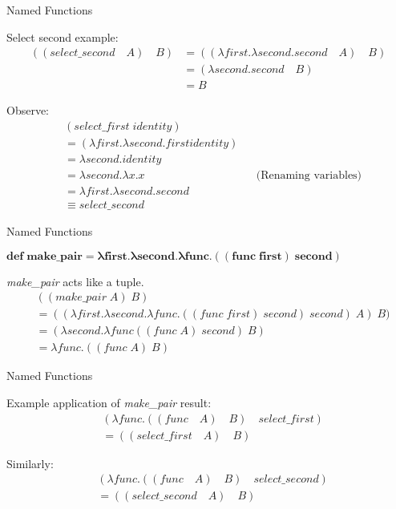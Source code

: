 \documentclass{beamer}
\begin{document}
\begin{frame}{Named Functions}
\begin{block}{Select second example:}
	\[\begin{aligned}
    	((select\_second \quad A) \quad B) &= ((\lambda first . \lambda second . second \quad A) \quad B) \\
        &= (\lambda second. second \quad B) \\
        &= B
    \end{aligned}\]
\end{block}
\begin{block}{Observe:}
	\[\begin{aligned}
 		&(select\_first \; identity) && \\
		&= (\lambda first . \lambda second . first identity) && \\
        &= \lambda second . identity && \\
        &= \lambda second . \lambda x . x && \text{(Renaming variables)} \\
        &= \lambda first . \lambda second . second && \\
        &\equiv select\_second &&
    \end{aligned}\]
\end{block}
\end{frame}

\begin{frame}{Named Functions}
	\begin{framed} $\mathbf{def \; make\_pair = \lambda first . \lambda second . \lambda func . ((func \; first) \; second)}$ \end{framed}
\textit{make\_pair} acts like a tuple.
    \begin{align*}
    	&((make\_pair \; A) \; B) \\
        &= ((\lambda first . \lambda second . \lambda func . ((func \; first) \; second) \; second) \; A) \; B) \\
        &= (\lambda second . \lambda func ((func \; A) \; second) \; B) \\
        &= \lambda func . ((func \; A) \; B)
    \end{align*}
\end{frame}

\begin{frame}{Named Functions}
	\begin{block}{Example application of \textit{make\_pair} result:}
    \begin{align*}
    	&(\lambda func . ((func \quad A) \quad B) \quad select\_first) \\
        &=((select\_first \quad A) \quad B)
    \end{align*}
    \end{block}
    \begin{block}{Similarly:}
    \begin{align*}
    	&(\lambda func . ((func \quad A) \quad B) \quad select\_second) \\
        &= ((select\_second \quad A) \quad B)
    \end{align*}
    \end{block}
\end{frame}
\end{document}

